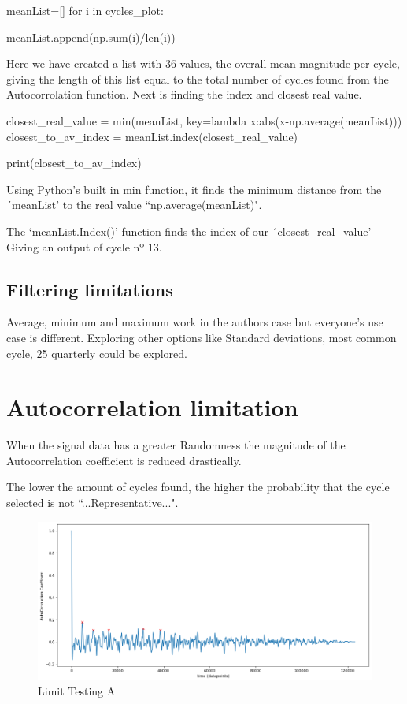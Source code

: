\begin{python}
meanList=[]
for i in cycles_plot:

    meanList.append(np.sum(i)/len(i))
\end{python}

Here we have created a list with 36 values, the overall mean magnitude per cycle, giving the length of this list equal to the total number of cycles found from the Autocorrolation function. 
Next is finding the index and closest real value. 
\begin{python}
closest_real_value = min(meanList, key=lambda x:abs(x-np.average(meanList)))
closest_to_av_index = meanList.index(closest_real_value)

print(closest_to_av_index)
\end{python}

Using Python's built in min function, it finds the minimum distance from the ´meanList' to the real value ``np.average(meanList)". \cite{realValue}

The `meanList.Index()' function finds the index of our  ´closest\_real\_value' Giving an output of cycle nº 13.

\subsection{Filtering limitations}
Average, minimum and maximum work in the authors case but everyone's use case is different. Exploring other options like Standard deviations, most common cycle, 25 quarterly could be explored. 
\section{Autocorrelation limitation}\label{limitation}

When the signal data has a greater Randomness the magnitude of the Autocorrelation coefficient is reduced drastically. 

The lower the amount of cycles found, the higher the probability that the cycle selected is not ``...Representative...". 

\begin{figure}[ht]
\centering
\includegraphics[scale=0.40]{images/autocorrolationBadCoefficentWithPeaks.png}
\caption{Limit Testing A}
\label{LimitA}
\end{figure}

